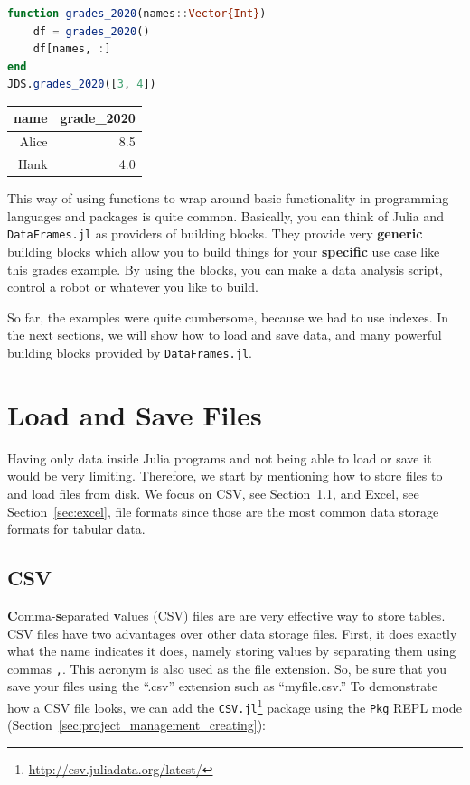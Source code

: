 \documentclass[
  notoc %
]{tufte-book}
\DeclareRobustCommand{\href}[2]{#2\footnote{\url{#1}}}
\newcommand{\passthrough}[1]{#1}
\begin{document}
\begin{lstlisting}[language=Julia]
function grades_2020(names::Vector{Int})
    df = grades_2020()
    df[names, :]
end
JDS.grades_2020([3, 4])
\end{lstlisting}

\begin{longtable}[]{@{}rr@{}}
\toprule
name & grade\_2020 \\
\midrule
\endhead
Alice & 8.5 \\
Hank & 4.0 \\
\bottomrule
\end{longtable}

This way of using functions to wrap around basic functionality in
programming languages and packages is quite common. Basically, you can
think of Julia and \passthrough{\lstinline!DataFrames.jl!} as providers
of building blocks. They provide very \textbf{generic} building blocks
which allow you to build things for your \textbf{specific} use case like
this grades example. By using the blocks, you can make a data analysis
script, control a robot or whatever you like to build.

So far, the examples were quite cumbersome, because we had to use
indexes. In the next sections, we will show how to load and save data,
and many powerful building blocks provided by
\passthrough{\lstinline!DataFrames.jl!}.

\hypertarget{sec:load_save}{%
\section{Load and Save Files}\label{sec:load_save}}

Having only data inside Julia programs and not being able to load or
save it would be very limiting. Therefore, we start by mentioning how to
store files to and load files from disk. We focus on CSV, see
Section~\ref{sec:csv}, and Excel, see Section~\ref{sec:excel}, file
formats since those are the most common data storage formats for tabular
data.

\hypertarget{sec:csv}{%
\subsection{CSV}\label{sec:csv}}

\textbf{C}omma-\textbf{s}eparated \textbf{v}alues (CSV) files are are
very effective way to store tables. CSV files have two advantages over
other data storage files. First, it does exactly what the name indicates
it does, namely storing values by separating them using commas
\passthrough{\lstinline!,!}. This acronym is also used as the file
extension. So, be sure that you save your files using the ``.csv''
extension such as ``myfile.csv.'' To demonstrate how a CSV file looks,
we can add the
\href{http://csv.juliadata.org/latest/}{\passthrough{\lstinline!CSV.jl!}}
package using the \passthrough{\lstinline!Pkg!} REPL mode
(Section~\ref{sec:project_management_creating}):
\end{document}

